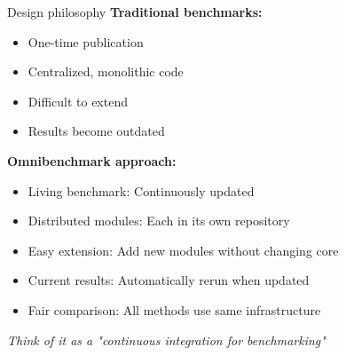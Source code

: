\documentclass[aspectratio=169]{beamer}
\begin{document}
\begin{frame}{Design philosophy}
    \textbf{Traditional benchmarks:}
    \begin{itemize}
        \item One-time publication
        \item Centralized, monolithic code
        \item Difficult to extend
        \item Results become outdated
    \end{itemize}
    
    \vspace{0.3cm}
    \textbf{Omnibenchmark approach:}
    \begin{itemize}
        \item Living benchmark: Continuously updated
        \item Distributed modules: Each in its own repository
        \item Easy extension: Add new modules without changing core
        \item Current results: Automatically rerun when updated
        \item Fair comparison: All methods use same infrastructure
    \end{itemize}
    
    \vspace{0.3cm}
    \textit{Think of it as a "continuous integration for benchmarking"}
\end{frame}
\end{document}
